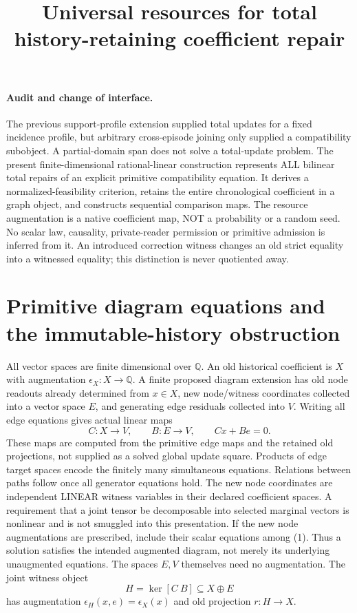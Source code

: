 \documentclass[11pt]{article}
\title{Universal resources for total history-retaining coefficient repair}
\author{}\date{}
\begin{document}
\maketitle
\paragraph{Audit and change of interface.}
The previous support-profile extension supplied total updates for a fixed incidence profile, but arbitrary cross-episode joining only supplied a compatibility subobject. A partial-domain span does not solve a total-update problem. The present finite-dimensional rational-linear construction represents ALL bilinear total repairs of an explicit primitive compatibility equation. It derives a normalized-feasibility criterion, retains the entire chronological coefficient in a graph object, and constructs sequential comparison maps. The resource augmentation is a native coefficient map, NOT a probability or a random seed. No scalar law, causality, private-reader permission or primitive admission is inferred from it. An introduced correction witness changes an old strict equality into a witnessed equality; this distinction is never quotiented away.

\section{Primitive diagram equations and the immutable-history obstruction}
All vector spaces are finite dimensional over $\mathbb Q$. An old historical coefficient is $X$ with augmentation $\epsilon_X:X\to\mathbb Q$. A finite proposed diagram extension has old node readouts already determined from $x\in X$, new node/witness coordinates collected into a vector space $E$, and generating edge residuals collected into $V$. Writing all edge equations gives actual linear maps
\[
 C:X\to V,\qquad B:E\to V,\qquad Cx+Be=0.\tag{1}
\]
These maps are computed from the primitive edge maps and the retained old projections, not supplied as a solved global update square. Products of edge target spaces encode the finitely many simultaneous equations. Relations between paths follow once all generator equations hold. The new node coordinates are independent LINEAR witness variables in their declared coefficient spaces. A requirement that a joint tensor be decomposable into selected marginal vectors is nonlinear and is not smuggled into this presentation. If the new node augmentations are prescribed, include their scalar equations among (1). Thus a solution satisfies the intended augmented diagram, not merely its underlying unaugmented equations. The spaces $E,V$ themselves need no augmentation. The joint witness object
\[
 H=\ker[C\ B]\subseteq X\oplus E
\]
has augmentation $\epsilon_H(x,e)=\epsilon_X(x)$ and old projection $r:H\to X$.
\end{document}
